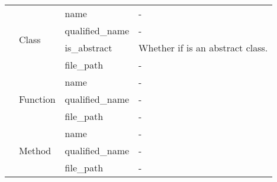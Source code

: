 \begin{tabular}{p{1.6cm}||p{1.7cm}|p{2cm}p{10.8cm}}
\cline{2-2}\cline{3-3}\cline{4-4}\cline{5-5}
 & \multirow{4}{*}{Class} & name & - &  \\
\cline{3-3}\cline{4-4}\cline{5-5}
 &  & qualified\_name & - &  \\
\cline{3-3}\cline{4-4}\cline{5-5}
 &  & is\_abstract & Whether if is an abstract class. &  \\
\cline{3-3}\cline{4-4}\cline{5-5}
 &  & file\_path & - &  \\
\cline{2-2}\cline{3-3}\cline{4-4}\cline{5-5}
 & \multirow{3}{*}{Function} & name & - &  \\
\cline{3-3}\cline{4-4}\cline{5-5}
 &  & qualified\_name & - &  \\
\cline{3-3}\cline{4-4}\cline{5-5}
 &  & file\_path & - &  \\
\cline{2-2}\cline{3-3}\cline{4-4}\cline{5-5}
 & \multirow{3}{*}{Method} & name & - &  \\
\cline{3-3}\cline{4-4}\cline{5-5}
 &  & qualified\_name & - &  \\
\cline{3-3}\cline{4-4}\cline{5-5}
 &  & file\_path & - &  \\
\cline{1-1}\cline{2-2}\cline{3-3}\cline{4-4}\cline{5-5}
\hline
\end{tabular}